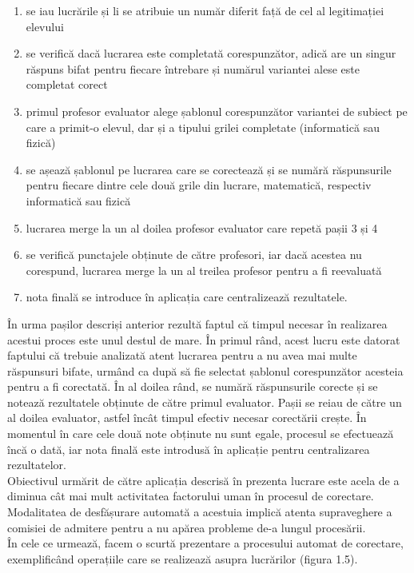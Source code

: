 \documentclass[a4paper,12pt]{report}
\newcommand\tab[1][1cm]{\hspace*{#1}}
\begin{document}
\begin{enumerate}
\setlength\itemsep{1pt}
\item se iau lucrările și li se atribuie un număr diferit față de cel al legitimației elevului 
\item se verifică dacă lucrarea este completată corespunzător, adică are un singur răspuns bifat pentru fiecare întrebare și numărul variantei alese este completat corect
\item primul profesor evaluator alege șablonul corespunzător variantei de subiect pe care a primit-o elevul, dar și a tipului grilei completate (informatică sau fizică)
\item se așează șablonul pe lucrarea care se corectează și se numără răspunsurile pentru fiecare dintre cele două grile din lucrare, matematică, respectiv informatică sau fizică
\item lucrarea merge la un al doilea profesor evaluator care repetă pașii 3 și 4
\item se verifică punctajele obținute de către profesori, iar dacă acestea nu corespund, lucrarea merge la un al treilea profesor pentru a fi reevaluată
\item nota finală se introduce în aplicația care centralizează rezultatele.
\end{enumerate}
\tab În urma pașilor descriși anterior rezultă faptul că timpul necesar în realizarea acestui proces este unul destul de mare. În primul rând, acest lucru este datorat faptului că trebuie analizată 
atent lucrarea pentru a nu avea mai multe răspunsuri bifate, urmând ca după să fie selectat șablonul corespunzător acesteia pentru a fi corectată. În al doilea rând, se numără răspunsurile corecte și se notează rezultatele
obținute de către primul evaluator. Pașii se reiau de către un al doilea evaluator, astfel încât timpul efectiv necesar corectării crește. În momentul în care cele două note obținute nu sunt egale, procesul se efectuează încă o dată, iar nota finală este introdusă în aplicație pentru centralizarea rezultatelor.
\\ \tab Obiectivul urmărit de către aplicația descrisă în prezenta lucrare este acela de a diminua cât mai mult activitatea factorului uman în procesul de corectare. Modalitatea de desfășurare automată a acestuia
implică atenta supraveghere a comisiei de admitere pentru a nu apărea probleme de-a lungul procesării. 
\\ \tab În cele ce urmează, facem o scurtă prezentare a procesului automat de corectare, exemplificând operațiile care se realizează asupra lucrărilor (figura 1.5).
\end{document}
